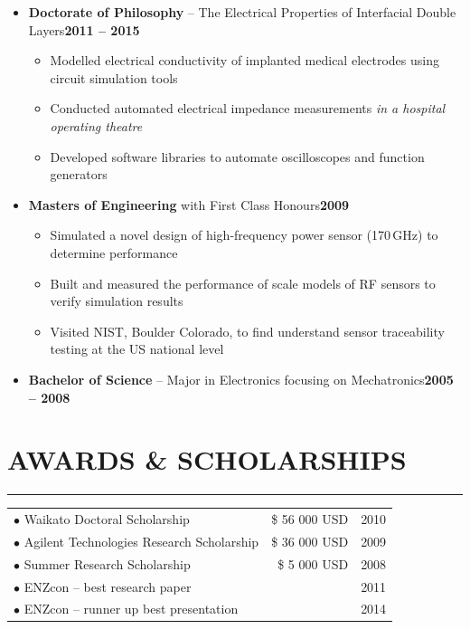 \documentclass[english]{extarticle}
\newcommand{\mySect}[2]{
    \section*{\textcolor{secondary}{#1}\hfill{\footnotesize\textmd{{#2}}}}
    \vspace{-2em}
    \textcolor{tertiary}{\hrule}
    \vspace{0.5em}
}
\begin{document}
\begin{itemize}

    \item \textbf{Doctorate of Philosophy} -- The Electrical Properties of Interfacial Double Layers\textbf{\footnotesize\hfill 2011 -- 2015}\begin{itemize}
        \item Modelled electrical conductivity of implanted medical electrodes using circuit simulation tools
        \item Conducted automated electrical impedance measurements \emph{in a hospital operating theatre}
        \item Developed software libraries to automate oscilloscopes and function generators
    \end{itemize}
    \item \textbf{Masters of Engineering} with First Class Honours\textbf{\footnotesize\hfill 2009}
    \begin{itemize}
        \item Simulated a novel design of high-frequency power sensor (170\,GHz) to determine performance
        \item Built and measured the performance of scale models of RF sensors to verify simulation results
        \item Visited NIST, Boulder Colorado, to find understand sensor traceability testing at the US national level
    \end{itemize}
    \item \textbf{Bachelor of Science} -- Major in Electronics focusing on Mechatronics\textbf{\footnotesize\hfill 2005 -- 2008}
\end{itemize}


\vspace{1.0cm}

\mySect{AWARDS \& SCHOLARSHIPS}{}
\begin{tabular}{lrr}
$\bullet$ Waikato Doctoral Scholarship & \$ 56 000 USD & 2010 \\
$\bullet$ Agilent Technologies Research Scholarship & \$ 36 000 USD & 2009 \\
$\bullet$ Summer Research Scholarship & \$ 5 000 USD & 2008 \\
$\bullet$ ENZcon -- best research paper & & 2011 \\
$\bullet$ ENZcon -- runner up best presentation \hspace{6.1cm} & & \hspace{0.7cm} 2014 \\
\end{tabular}
\end{document}
